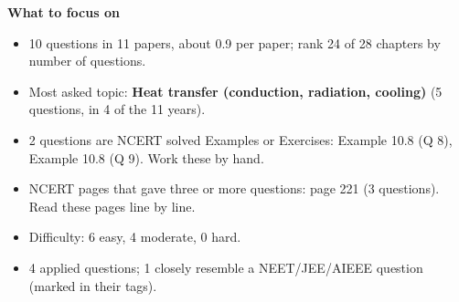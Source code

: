 \begin{minipage}[t]{0.63\linewidth}{\small\textbf{\color{crimson}What to focus on}\par\smallskip
\begin{itemize}[leftmargin=1.1em,itemsep=1pt,topsep=0pt]
\item 10 questions in 11 papers, about 0.9 per paper; rank 24 of 28 chapters by number of questions.
\item Most asked topic: \textbf{Heat transfer (conduction, radiation, cooling)} (5 questions, in 4 of the 11 years).
\item 2 questions are NCERT solved Examples or Exercises: Example 10.8 (Q 8), Example 10.8 (Q 9). Work these by hand.
\item NCERT pages that gave three or more questions: page 221 (3 questions). Read these pages line by line.
\item Difficulty: 6 easy, 4 moderate, 0 hard.
\item 4 applied questions; 1 closely resemble a NEET/JEE/AIEEE question (marked in their tags).
\end{itemize}}\end{minipage}\par
{}
